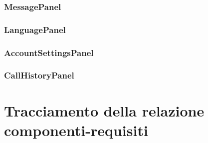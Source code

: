 \subsubsection{MessagePanel}\label{sec:messagepanel}

\subsubsection{LanguagePanel}\label{sec:languagepanel}

\subsubsection{AccountSettingsPanel}\label{sec:accountsettingspanel}

\subsubsection{CallHistoryPanel}\label{sec:callhistorypanel}

\clearpage

\section{Tracciamento della relazione componenti-requisiti}



